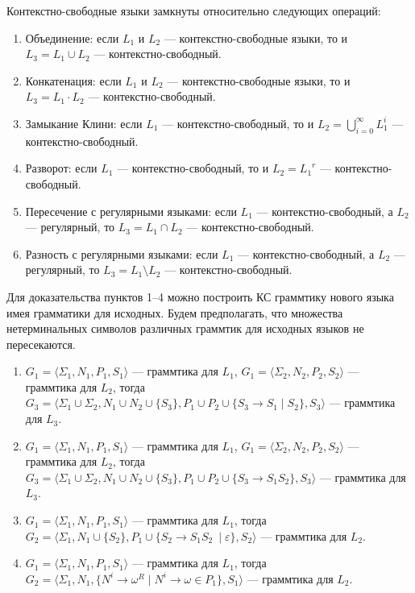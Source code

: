 \begin{theorem}
Контекстно-свободные языки замкнуты относительно следующих операций:
\begin{enumerate}
  \item Объединение: если $L_1$ и $L_2$ --- контекстно-свободные языки, то и $L_3 = L_1 \cup L_2$ --- контекстно-свободный.
  \item Конкатенация: если $L_1$ и $L_2$ --- контекстно-свободные языки, то и $L_3 = L_1 \cdot L_2$ --- контекстно-свободный.
  \item Замыкание Клини: если $L_1$ --- контекстно-свободный, то и $L_2 = \bigcup\limits_{i=0}^{\infty} L_1^i $ --- контекстно-свободный.
  \item Разворот: если $L_1$ --- контекстно-свободный, то и $L_2 = {L_1}^r$ --- контекстно-свободный.
  \item Пересечение с регулярными языками: если $L_1$ --- контекстно-свободный, а $L_2$ --- регулярный, то  $L_3 = L_1 \cap L_2$ --- контекстно-свободный.
  \item Разность с регулярными языками: если $L_1$ --- контекстно-свободный, а $L_2$ --- регулярный, то  $L_3 = L_1 \setminus L_2$ --- контекстно-свободный.
\end{enumerate}
\end{theorem}
Для доказательства пунктов 1--4 можно построить КС граммтику нового языка имея грамматики для исходных.
Будем предполагать, что множества нетерминальных символов различных граммтик для исходных языков не пересекаются.
\begin{enumerate}
\item $G_1=\langle\Sigma_1,N_1,P_1,S_1\rangle$ --- граммтика для $L_1$, $G_1=\langle\Sigma_2,N_2,P_2,S_2\rangle$ --- граммтика для $L_2$, тогда $G_3=\langle\Sigma_1 \cup \Sigma_2, N_1 \cup N_2 \cup \{S_3\}, P_1 \cup P_2 \cup \{S_3 \to S_1 \mid S_2\} ,S_3\rangle$ --- граммтика для $L_3$.

\item $G_1=\langle\Sigma_1,N_1,P_1,S_1\rangle$ --- граммтика для $L_1$, $G_1=\langle\Sigma_2,N_2,P_2,S_2\rangle$ --- граммтика для $L_2$, тогда $G_3=\langle\Sigma_1 \cup \Sigma_2, N_1 \cup N_2 \cup \{S_3\}, P_1 \cup P_2 \cup \{S_3 \to S_1 S_2\} ,S_3\rangle$ --- граммтика для $L_3$.

\item $G_1=\langle\Sigma_1,N_1,P_1,S_1\rangle$ --- граммтика для $L_1$, тогда $G_2=\langle\Sigma_1, N_1 \cup \{S_2\}, P_1 \cup \{S_2 \to S_1 S_2\ \mid \varepsilon\}, S_2\rangle$ --- граммтика для $L_2$.

\item $G_1=\langle\Sigma_1,N_1,P_1,S_1\rangle$ --- граммтика для $L_1$, тогда $G_2=\langle\Sigma_1, N_1, \{N^i \to \omega^R \mid N^i \to \omega \in P_1 \}, S_1\rangle$ --- граммтика для $L_2$.
\end{enumerate}

